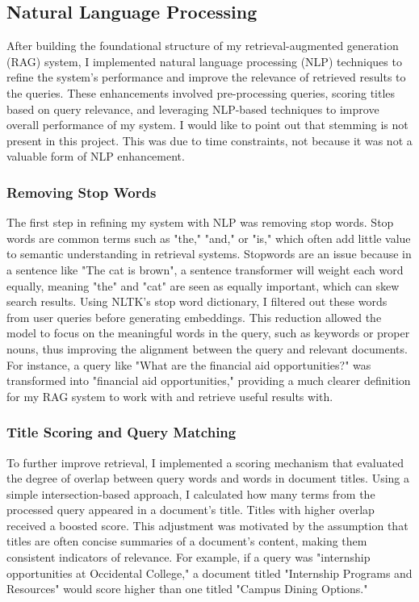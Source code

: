 \documentclass[10pt,twocolumn]{article}
\begin{document}
\subsection{Natural Language Processing}
After building the foundational structure of my retrieval-augmented generation (RAG) system, I implemented natural language processing (NLP) techniques to refine the system’s performance and improve the relevance of retrieved results to the queries. These enhancements involved pre-processing queries, scoring titles based on query relevance, and leveraging NLP-based techniques to improve overall performance of my system. I would like to point out that stemming is not present in this project. This was due to time constraints, not because it was not a valuable form of NLP enhancement.

\subsubsection{Removing Stop Words}

\indent The first step in refining my system with NLP was removing stop words. Stop words are common terms such as "the," "and," or "is," which often add little value to semantic understanding in retrieval systems\cite{coursera_stop_words}. Stopwords are an issue because in a sentence like "The cat is brown", a sentence transformer will weight each word equally, meaning "the" and "cat" are seen as equally important, which can skew search results. Using NLTK's stop word dictionary, I filtered out these words from user queries before generating embeddings. This reduction allowed the model to focus on the meaningful words in the query, such as keywords or proper nouns, thus improving the alignment between the query and relevant documents. For instance, a query like "What are the financial aid opportunities?" was transformed into "financial aid opportunities," providing a much clearer definition for my RAG system to work with and retrieve useful results with.

\subsubsection{Title Scoring and Query Matching}

To further improve retrieval, I implemented a scoring mechanism that evaluated the degree of overlap between query words and words in document titles. Using a simple intersection-based approach\cite{kedia_methods_scoring_nlp}, I calculated how many terms from the processed query appeared in a document’s title. Titles with higher overlap received a boosted score. This adjustment was motivated by the assumption that titles are often concise summaries of a document's content, making them consistent indicators of relevance. For example, if a query was "internship opportunities at Occidental College," a document titled "Internship Programs and Resources" would score higher than one titled "Campus Dining Options."
\end{document}
